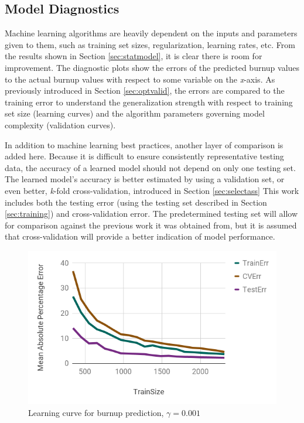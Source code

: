 \subsection{Model Diagnostics}
\label{sec:algeval}

Machine learning algorithms are heavily dependent on the inputs and parameters
given to them, such as training set sizes, regularization, learning rates, etc.
From the results shown in Section \ref{sec:statmodel}, it is clear there is
room for improvement.  The diagnostic plots show the errors of the predicted
burnup values to the actual burnup values with respect to some variable on the
\textit{x}-axis.  As previously introduced in Section \ref{sec:optvalid}, the
errors are compared to the training error to understand the generalization
strength with respect to training set size (learning curves) and the algorithm
parameters governing model complexity (validation curves). 

In addition to machine learning best practices, another layer of comparison is
added here.  Because it is difficult to ensure consistently representative
testing data, the accuracy of a learned model should not depend on only one
testing set.  The learned model's accuracy is better estimated by using a
validation set, or even better, \textit{k}-fold cross-validation, introduced in
Section \ref{sec:selectass} This work includes both the testing error (using
the testing set described in Section \ref{sec:training}) and cross-validation
error. The predetermined testing set will allow for comparison against the
previous work it was obtained from, but it is assumed that cross-validation
will provide a better indication of model performance.

\begin{figure}[!htb]
    \centering
    \includegraphics[width=\linewidth]{./chapters/demo_method/lc1.png}
    \caption{Learning curve for burnup prediction, $\gamma = 0.001$}
    \label{fig:lc1}
\end{figure}

